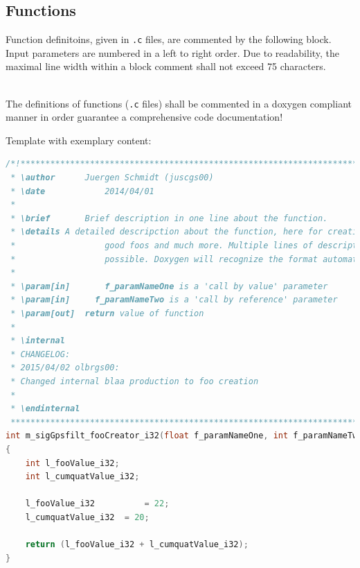 \subsection{Functions}
\label{sec:style:comments:functions}
Function definitoins, given in \texttt{.c} files, are commented by the following block. Input parameters are numbered in a left to right order. Due to readability, the maximal line width within a block comment shall not exceed 75 characters.

\\
The definitions of functions (\texttt{.c} files) shall be commented in a doxygen compliant manner in order guarantee a comprehensive code documentation!

\newpage
Template with exemplary content:
\begin{lstlisting}[language=C]
/*!**********************************************************************
 * \author 		Juergen Schmidt (juscgs00)
 * \date 			2014/04/01
 * 
 * \brief		Brief description in one line about the function.
 * \details	A detailed descripction about the function, here for creating 
 * 					good foos and much more. Multiple lines of description is
 * 					possible. Doxygen will recognize the format automatically.
 * 
 * \param[in]		f_paramNameOne is a 'call by value' parameter
 * \param[in]	  f_paramNameTwo is a 'call by reference' parameter
 * \param[out]	return value of function
 * 
 * \internal
 * CHANGELOG:
 * 2015/04/02 olbrgs00:
 * Changed internal blaa production to foo creation
 *
 * \endinternal
 ***********************************************************************/
int m_sigGpsfilt_fooCreator_i32(float f_paramNameOne, int f_paramNameTwo)
{
	int l_fooValue_i32;
	int l_cumquatValue_i32;
	
	l_fooValue_i32 			= 22;
	l_cumquatValue_i32 	= 20;
	
	return (l_fooValue_i32 + l_cumquatValue_i32);
}
\end{lstlisting}